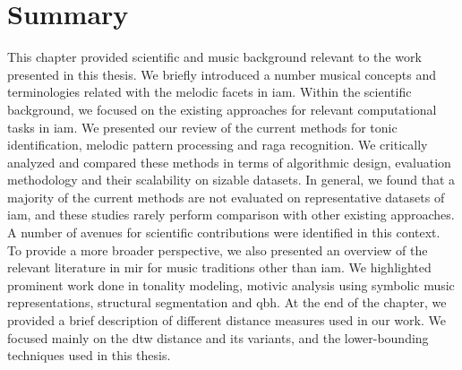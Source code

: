 \section{Summary}
\label{sec:background_summary}

This chapter provided scientific and music background relevant to the work presented in this thesis. We briefly introduced a number musical concepts and terminologies related with the melodic facets in \gls{iam}. Within the scientific background, we focused on the existing approaches for relevant computational tasks in \gls{iam}. We presented our review of the current methods for tonic identification, melodic pattern processing and \gls{raga} recognition. We critically analyzed and compared these methods in terms of algorithmic design, evaluation methodology and their scalability on sizable datasets. In general, we found that a majority of the current methods are not evaluated on representative datasets of \gls{iam}, and these studies rarely perform comparison with other existing approaches. A number of avenues for scientific contributions were identified in this context. To provide a more broader perspective, we also presented an overview of the relevant literature in \gls{mir} for music traditions other than \gls{iam}. We highlighted prominent work done in tonality modeling, motivic analysis using symbolic music representations, structural segmentation and \gls{qbh}. At the end of the chapter, we provided a brief description of different distance measures used in our work. We focused mainly on the \gls{dtw} distance and its variants, and the lower-bounding techniques used in this thesis.
 
